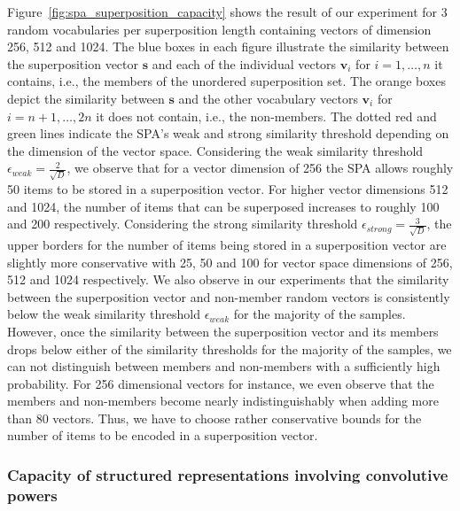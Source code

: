Figure~\ref{fig:spa_superposition_capacity} shows the result of our experiment for \num{3} random vocabularies per superposition length containing vectors of dimension \num{256}, \num{512} and \num{1024}.
The blue boxes in each figure illustrate the similarity between the superposition vector $ \mathbf{s}$ and each of the individual vectors $ \mathbf{v}_i$ for $i=1, \ldots, n$ it contains, i.e., the members of the unordered superposition set.
The orange boxes depict the similarity between $ \mathbf{s}$ and the other vocabulary vectors $ \mathbf{v}_i$ for $i=n+1, \ldots, 2n$ it does not contain, i.e., the non-members.
The dotted red and green lines indicate the \ac{SPA}'s weak and strong similarity threshold depending on the dimension of the vector space.
Considering the weak similarity threshold $\epsilon_{weak} = \tfrac{2}{\sqrt{D}}$, we observe that for a vector dimension of \num{256} the \ac{SPA} allows roughly \num{50} items to be stored in a superposition vector.
For higher vector dimensions \num{512} and \num{1024}, the number of items that can be superposed increases to roughly \num{100} and \num{200} respectively.
Considering the strong similarity threshold $\epsilon_{strong} = \tfrac{3}{\sqrt{D}}$, the upper borders for the number of items being stored in a superposition vector are slightly more conservative with \num{25}, \num{50} and \num{100} for vector space dimensions of \num{256}, \num{512} and \num{1024} respectively.
We also observe in our experiments that the similarity between the superposition vector and non-member random vectors is consistently below the weak similarity threshold $\epsilon_{weak}$ for the majority of the samples.
However, once the similarity between the superposition vector and its members drops below either of the similarity thresholds for the majority of the samples, we can not distinguish between members and non-members with a sufficiently high probability.
For \num{256} dimensional vectors for instance, we even observe that the members and non-members become nearly indistinguishably when adding more than \num{80} vectors.
Thus, we have to choose rather conservative bounds for the number of items to be encoded in a superposition vector.

\subsubsection{Capacity of structured representations involving convolutive powers}%
\label{ssubsec:capacity_of_structured_representations_involving_convolutive_powers}

